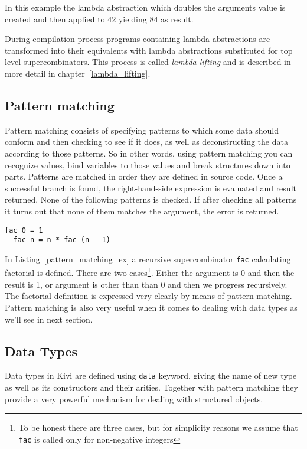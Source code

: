 \documentclass[a4paper]{report}
\begin{document}
In this example the lambda abstraction which doubles the arguments value is
created and then applied to 42 yielding 84 as result.

During compilation process programs containing lambda abstractions are
transformed into their equivalents with lambda abstractions substituted for top
level supercombinators. This process is called \textit{lambda lifting} and is
described in more detail in chapter~\ref{lambda_lifting}.

\subsection{Pattern matching}

Pattern matching consists of specifying patterns to which some data should
conform and then checking to see if it does, as well as deconstructing the data
according to those patterns. So in other words, using pattern matching you can
recognize values, bind variables to those values and break structures down into
parts.
Patterns are matched in order they are defined in source code. Once a
successful branch is found, the right-hand-side expression is evaluated and
result returned. None of the following patterns is checked. If after checking
all patterns it turns out that none of them matches the argument, the error is
returned.

\begin{lstlisting}[label=pattern_matching_ex,caption={Factorial using pattern matching.}]
  fac 0 = 1
  fac n = n * fac (n - 1)
\end{lstlisting}

In Listing~\ref{pattern_matching_ex} a recursive supercombinator \texttt{fac}
calculating factorial is defined. There are two cases\footnote{To be honest
there are three cases, but for simplicity reasons we assume that
\texttt{fac} is called only for non-negative integers}. Either the
argument is 0 and then the result is 1, or argument is other than than 0 and
then we progress recursively. The factorial definition is expressed very
clearly by means of pattern matching.
Pattern matching is also very useful when it comes to dealing with data
types as we'll see in next section.

\subsection{Data Types}
Data types in Kivi are defined using \texttt{data} keyword, giving the name of
new type as well as its constructors and their arities. Together with pattern matching they
provide a very powerful mechanism for dealing with structured objects.
\end{document}
